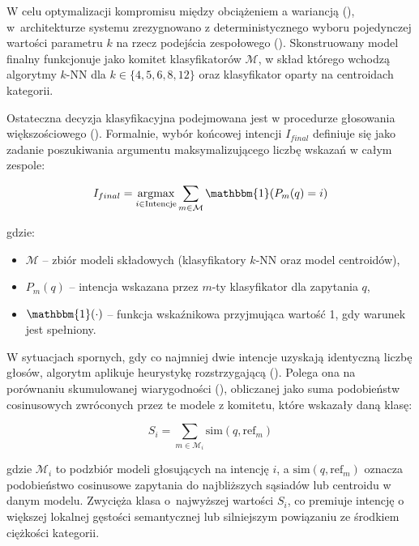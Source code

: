 W celu optymalizacji kompromisu między obciążeniem a wariancją (), w~architekturze systemu  zrezygnowano z deterministycznego wyboru pojedynczej wartości parametru $k$ na rzecz podejścia zespołowego (). Skonstruowany model finalny funkcjonuje jako komitet klasyfikatorów $\mathcal{M}$, w skład którego wchodzą algorytmy $k$-NN dla $k \in \{4, 5, 6, 8, 12\}$ oraz klasyfikator oparty na centroidach kategorii.

Ostateczna decyzja klasyfikacyjna podejmowana jest w procedurze głosowania większościowego (). Formalnie, wybór końcowej intencji $I_{final}$ definiuje się jako zadanie poszukiwania argumentu maksymalizującego liczbę wskazań w całym zespole:

\begin{equation}
    I_{final} = \argmax_{i \in \text{Intencje}} \sum_{m \in \mathcal{M}} \mathbbm{1}(P_m(q) = i)
\end{equation}

gdzie:
\begin{itemize}
    \item $\mathcal{M}$ -- zbiór modeli składowych (klasyfikatory $k$-NN oraz model centroidów),
    \item $P_m(q)$ -- intencja wskazana przez $m$-ty klasyfikator dla zapytania $q$,
    \item $\mathbbm{1}(\cdot)$ -- funkcja wskaźnikowa przyjmująca wartość 1, gdy warunek jest spełniony.
\end{itemize}

W sytuacjach spornych, gdy co najmniej dwie intencje uzyskają identyczną liczbę głosów, algorytm aplikuje heurystykę rozstrzygającą (). Polega ona na porównaniu skumulowanej wiarygodności (), obliczanej jako suma podobieństw cosinusowych zwróconych przez te modele z komitetu, które wskazały daną klasę:

\begin{equation}
    S_i = \sum_{m \in \mathcal{M}_i} \text{sim}(q, \text{ref}_m)
\end{equation}

gdzie $\mathcal{M}_i$ to podzbiór modeli głosujących na intencję $i$, a $\text{sim}(q, \text{ref}_m)$ oznacza podobieństwo cosinusowe zapytania do najbliższych sąsiadów lub centroidu w danym modelu. Zwycięża klasa o~najwyższej wartości $S_i$, co premiuje intencję o większej lokalnej gęstości semantycznej lub silniejszym powiązaniu ze środkiem ciężkości kategorii.


